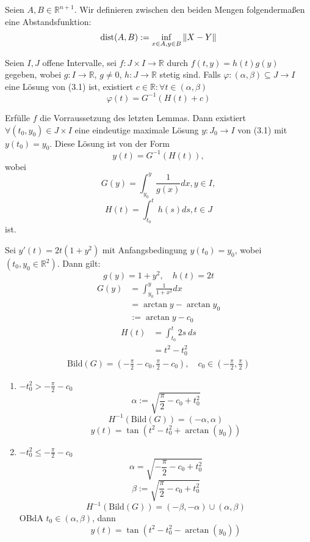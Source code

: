 \documentclass{report}
\newcommand{\bR}{\mathbb{R}}
\begin{document}
\begin{definition}
 Seien $A,B \in \bR^{n+1}$. Wir definieren zwischen den beiden Mengen folgendermaßen eine Abstandsfunktion: \begin{align*}
  \text{dist}(A,B) := \inf_{x \in A, y \in B} \norm{X - Y}                                                                                                   
 \end{align*}
\clearpage
\begin{lemma}
	Seien $I,J$ offene Intervalle, sei $f : J \times I \to \bR$ durch $f(t,y) = h(t)g(y)$ gegeben, wobei $g : I \to \bR$, $g \neq 0$, $h : J \to \bR$ stetig sind. Falls $\varphi : (\alpha, \beta) \subseteq J \to I$ eine Lösung von (3.1) ist, existiert $c \in \bR : \forall t \in (\alpha, \beta)$
	\[\varphi(t) = G^{-1}(H(t) + c)\]
\end{lemma}
\begin{theorem}
	Erfülle $f$ die Vorraussetzung des letzten Lemmas. Dann existiert $\forall (t_0, y_0) \in J \times I$ eine eindeutige maximale Lösung $y : J_0 \to I$ von (3.1) mit $y(t_0) = y_0$. Diese Lösung ist von der Form
	\[y(t) = G^{-1}(H(t)),\]
	wobei \[G(y) = \int_{y_0}^y \frac{1}{g(x)} dx, y \in I,\] \[H(t) = \int_{t_0}^{t}h(s) ds, t \in J\] ist. 
\end{theorem}
\end{definition}
\begin{beispiel}
	Sei $y'(t) = 2t(1 + y^2)$ mit Anfangsbedingung $y(t_0) = y_0$, wobei $(t_0, y_0 \in \bR^2)$.
	Dann gilt:
	\[
		g(y) = 1 + y^2, \quad h(t) = 2t
	\]
	\begin{align*}
		G(y) &= \int_{y_0}^y \frac{1}{1+x^2} dx \\
			 &= \arctan y - \arctan y_0\\
			 &:= \arctan y - c_0
	\end{align*}
	\begin{align*}
		H(t) &= \int_{t_0}^t 2s\ ds\\
			 &= t^2 - t_0^2
	\end{align*}
	\begin{align*}
		\text{Bild}(G) = \left(-\frac{\pi}{2} - c_0, \frac{\pi}{2} - c_0\right), \quad c_0 \in \left(-\frac{\pi}{2},\frac{\pi}{2}\right)
	\end{align*}
	\begin{enumerate}
		\item $-t_0^2 > -\frac{\pi}{2} - c_0$
		\[\alpha := \sqrt{\frac{\pi}{2} - c_0 + t_0^2}\]
		\[H^{-1}(\text{Bild}(G)) = (-\alpha, \alpha)\]
		\[y(t) = \tan(t^2 - t_0^2 + \arctan(y_0))\]
		\item $-t_0^2 \leq -\frac{\pi}{2} - c_0$
		\[\alpha = \sqrt{-\frac{\pi}{2} - c_0 + t_0^2}\]
		\[\beta := \sqrt{\frac{\pi}{2} - c_0 + t_0^2}\]
		\[H^{-1}(\text{Bild}(G)) = (-\beta, -\alpha) \cup (\alpha, \beta)\]
		OBdA $t_0 \in (\alpha, \beta)$, dann
		\[y(t) = \tan(t^2 - t_0^2 - \arctan(y_0))\]
	\end{enumerate}
\end{beispiel}
\clearpage
\end{document}
